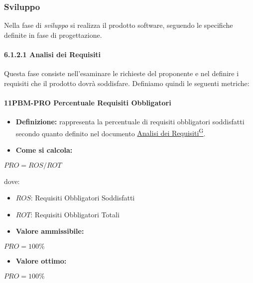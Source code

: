 \subsubsection{Sviluppo}
Nella fase di \emph{sviluppo} si realizza il prodotto software, seguendo le specifiche definite in fase di progettazione.
\paragraph*{6.1.2.1 Analisi dei Requisiti}
Questa fase consiste nell'esaminare le richieste del proponente e nel definire i requisiti che il prodotto dovrà soddisfare. Definiamo quindi le seguenti metriche:

\paragraph*{11PBM-PRO Percentuale Requisiti Obbligatori}
\begin{itemize}
    \item \textbf{Definizione:} rappresenta la percentuale di requisiti obbligatori soddisfatti secondo quanto definito nel documento \href{https://code7crusaders.github.io/docs/RTB/documentazione_interna/glossario.html#analisi-dei-requisiti}{Analisi dei Requisiti\textsuperscript{G}}.
    \item \textbf{Come si calcola:}
\end{itemize}
\begin{center}
   $PRO = ROS/ROT$ 
\end{center}
dove:
\begin{itemize}[label=$\rightarrow$]
    \item $ROS$: Requisiti Obbligatori Soddisfatti
    \item $ROT$: Requisiti Obbligatori Totali
\end{itemize}
\begin{itemize}
    \item \textbf{Valore ammissibile:}
\end{itemize}
\begin{center}
    $PRO = 100\%$
\end{center}
\begin{itemize}
    \item \textbf{Valore ottimo:}
\end{itemize}
\begin{center}
    $PRO = 100\%$
\end{center}


